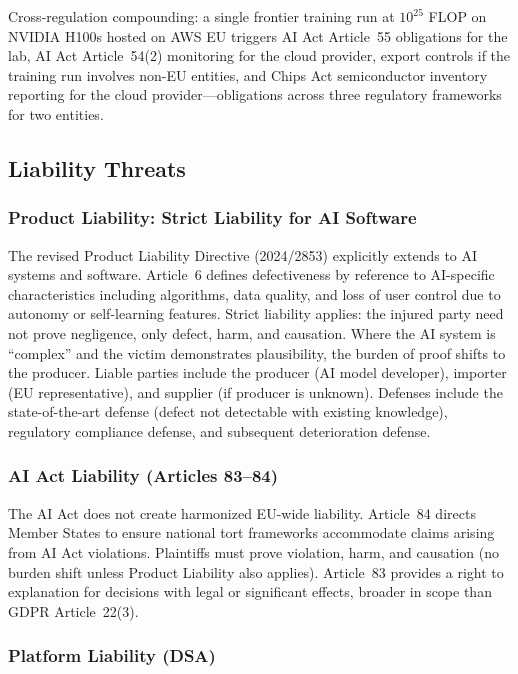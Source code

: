 \documentclass[11pt,a4paper]{article}
\begin{document}
Cross-regulation compounding: a single frontier training run at $10^{25}$ FLOP on NVIDIA H100s hosted on AWS EU triggers AI Act Article~55 obligations for the lab, AI Act Article~54(2) monitoring for the cloud provider, export controls if the training run involves non-EU entities, and Chips Act semiconductor inventory reporting for the cloud provider---obligations across three regulatory frameworks for two entities.

\subsection{Liability Threats}

\subsubsection{Product Liability: Strict Liability for AI Software}

The revised Product Liability Directive (2024/2853) explicitly extends to AI systems and software. Article~6 defines defectiveness by reference to AI-specific characteristics including algorithms, data quality, and loss of user control due to autonomy or self-learning features. Strict liability applies: the injured party need not prove negligence, only defect, harm, and causation. Where the AI system is ``complex'' and the victim demonstrates plausibility, the burden of proof shifts to the producer. Liable parties include the producer (AI model developer), importer (EU representative), and supplier (if producer is unknown). Defenses include the state-of-the-art defense (defect not detectable with existing knowledge), regulatory compliance defense, and subsequent deterioration defense.

\subsubsection{AI Act Liability (Articles 83--84)}

The AI Act does not create harmonized EU-wide liability. Article~84 directs Member States to ensure national tort frameworks accommodate claims arising from AI Act violations. Plaintiffs must prove violation, harm, and causation (no burden shift unless Product Liability also applies). Article~83 provides a right to explanation for decisions with legal or significant effects, broader in scope than GDPR Article~22(3).

\subsubsection{Platform Liability (DSA)}
\end{document}
